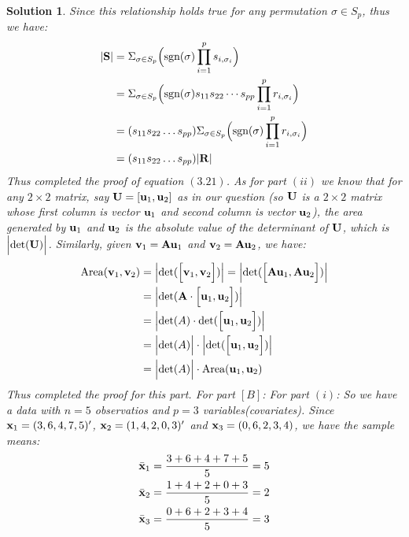 \documentclass[11pt]{article}
\newtheorem{sol}{Solution}
\begin{document}
\begin{sol}
	Since this relationship holds true for any permutation $\sigma \in S_p$, thus we have:
	\begin{align*}
		|{\bf S}| &= \Sigma_{\sigma \in S_p}\Big(\text{sgn}(\sigma)\prod_{i = 1}^p s_{i, \sigma_i}\Big)\\
		&= \Sigma_{\sigma \in S_p}\Big(\text{sgn}(\sigma)s_{11}s_{22}\cdots s_{pp}\prod_{i = 1}^pr_{i, \sigma_i}\Big)\\
		&= (s_{11}s_{22}\ldots s_{pp})\Sigma_{\sigma \in S_p}\Big(\text{sgn}(\sigma)\prod_{i = 1}^p r_{i, \sigma_i}\Big)\\
		&= (s_{11}s_{22}\ldots s_{pp})|{\bf R}|
	\end{align*}
	Thus completed the proof of equation $(3.21)$.\vskip 2mm
	As for part $(ii)$\vskip 2mm
	 we know that for any $2\times 2$ matrix, say ${\bf U} = [{\bf u}_1, {\bf u}_2]$ as in our question (so ${\bf U}$ is a $2\times 2$ matrix whose first column is vector ${\bf u}_1$ and second column is vector ${\bf u}_2$), the area generated by ${\bf u}_1$ and ${\bf u}_2$ is the absolute value of the determinant of ${\bf U}$, which is $\Big| \text{det}({\bf U})\Big|$.\vskip 2mm
	 Similarly, given ${\bf v}_1 = {\bf A}{\bf u}_1$ and ${\bf v}_2 = {\bf A}{\bf u}_2$, we have:
	 \begin{align*}
	 	\text{Area}({\bf v}_1, {\bf v}_2) &= \Big|\text{det}(\Big[{\bf v}_1, {\bf v}_2\Big])\Big| = \Big|\text{det}(\Big[{\bf A}{\bf u}_1, {\bf A}{\bf u}_2\Big])\Big|\\
	 	&= \Big|\text{det}({\bf A}\cdot \Big[{\bf u}_1, {\bf u}_2\Big])\Big|\\
	 	&= \Big|\text{det}(A)\cdot \text{det}(\Big[{\bf u}_1, {\bf u}_2\Big])\Big|\\
	 	&= \Big|\text{det}(A)\Big| \cdot \Big|\text{det}(\Big[{\bf u}_1, {\bf u}_2\Big])\Big|\\
	 	&=  \Big|\text{det}(A)\Big| \cdot \text{Area}({\bf u}_1, {\bf u}_2)
	 \end{align*}
	 Thus completed the proof for this part.\vskip 2mm
	 For part $[B]$:\vskip 2mm
	 For part $(i)$:
	 So we have a data with $n = 5$ observatios and $p = 3$ variables(covariates).\vskip 2mm
	 Since ${\bf x}_1 =(3, 6, 4, 7, 5)'$, ${\bf x}_2 = (1, 4, 2, 0, 3)'$ and ${\bf x}_3 = (0, 6, 2, 3, 4)$, we have the sample means:
	 \begin{align*}
	 	\bar{{\bf x}}_1 &= \frac{3 + 6 + 4 + 7 + 5}{5} = 5\\
	 	\bar{{\bf x}}_2 &= \frac{1 + 4 + 2 + 0 + 3}{5} = 2\\
	 	\bar{{\bf x}}_3 &= \frac{0 + 6 + 2 + 3 + 4}{5} = 3\\

\end{align*}
\end{sol}
\end{document}
